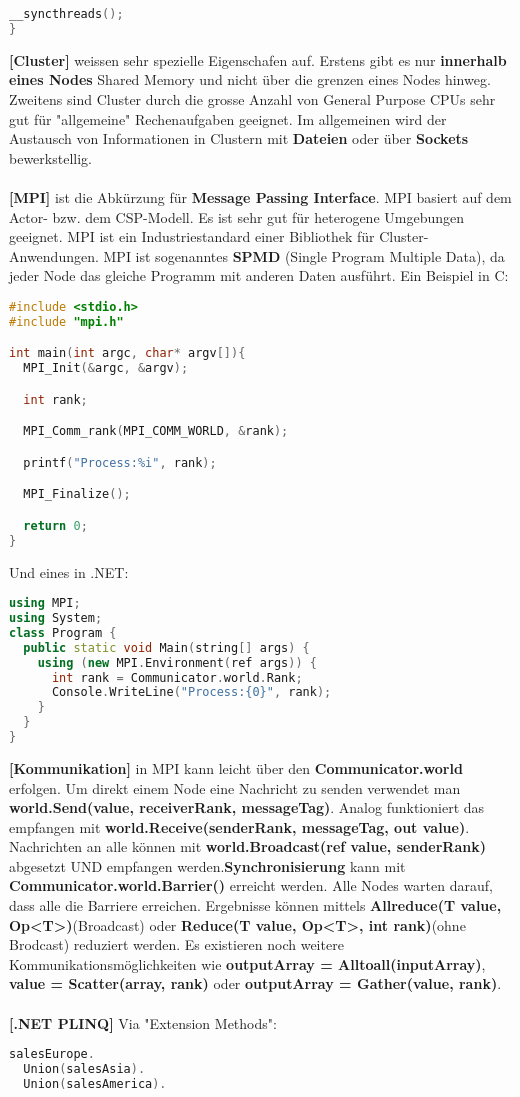 \documentclass[8pt]{extarticle}
\let\oldtextbf\textbf
\renewcommand{\textbf}{\tiny\oldtextbf}
\begin{document}
\begin{multicols*}{5}
\begin{lstlisting}[language=c]
  __syncthreads();
}
\end{lstlisting}
\textbf{[Cluster]} weissen sehr spezielle Eigenschafen auf. Erstens gibt es nur \textbf{innerhalb eines Nodes} Shared Memory und nicht über die grenzen eines Nodes hinweg. Zweitens sind Cluster durch die grosse Anzahl von General Purpose CPUs sehr gut für "allgemeine" Rechenaufgaben geeignet. Im allgemeinen wird der Austausch von Informationen in Clustern mit \textbf{Dateien} oder über \textbf{Sockets} bewerkstellig.\\\\
\textbf{[MPI]} ist die Abkürzung für \textbf{Message Passing Interface}. MPI basiert auf dem Actor- bzw. dem CSP-Modell. Es ist sehr gut für heterogene Umgebungen geeignet. MPI ist ein Industriestandard einer Bibliothek für Cluster-Anwendungen. MPI ist sogenanntes \textbf{SPMD} (Single Program Multiple Data), da jeder Node das gleiche Programm mit anderen Daten ausführt. Ein Beispiel in C:
\begin{lstlisting}[language=c]
#include <stdio.h>
#include "mpi.h"

int main(int argc, char* argv[]){
  MPI_Init(&argc, &argv);

  int rank;

  MPI_Comm_rank(MPI_COMM_WORLD, &rank);

  printf("Process:%i", rank);

  MPI_Finalize();

  return 0;
}
\end{lstlisting}
Und eines in .NET:
\begin{lstlisting}[language=c++]
using MPI;
using System;
class Program {
  public static void Main(string[] args) {
    using (new MPI.Environment(ref args)) {
      int rank = Communicator.world.Rank;
      Console.WriteLine("Process:{0}", rank);
    }
  }
}
\end{lstlisting}
\textbf{[Kommunikation]} in MPI kann leicht über den \textbf{Communicator.world} erfolgen. Um direkt einem Node eine Nachricht zu senden verwendet man \textbf{world.Send(value, receiverRank, messageTag)}. Analog funktioniert das empfangen mit \textbf{world.Receive(senderRank, messageTag, out value)}. Nachrichten an alle können mit \textbf{world.Broadcast(ref value, senderRank)} abgesetzt UND empfangen werden.\textbf{Synchronisierung} kann mit \textbf{Communicator.world.Barrier()} erreicht werden. Alle Nodes warten darauf, dass alle die Barriere erreichen. Ergebnisse können mittels \textbf{Allreduce(T value, Op<T>)}(Broadcast) oder \textbf{Reduce(T value, Op<T>, int rank)}(ohne Brodcast) reduziert werden. Es existieren noch weitere Kommunikationsmöglichkeiten wie \textbf{outputArray = Alltoall(inputArray)}, \textbf{value = Scatter(array, rank)} oder \textbf{outputArray = Gather(value, rank)}.\\\\
\textbf{[.NET PLINQ]} Via "Extension Methods":
\begin{lstlisting}[language=c++]
salesEurope.
  Union(salesAsia).
  Union(salesAmerica).


\end{lstlisting}
\end{multicols*}
\end{document}
